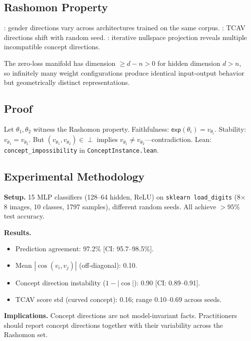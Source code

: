 \documentclass{article}
\newcommand{\incomp}{\perp}
\begin{document}
\subsection{Rashomon Property}

\citet{bolukbasi2016man}: gender directions vary across architectures trained on the same corpus.
\citet{kim2018tcav}: TCAV directions shift with random seed.
\citet{ravfogel2020null}: iterative nullspace projection reveals multiple incompatible concept directions.

The zero-loss manifold has dimension $\geq d - n > 0$ for hidden dimension $d > n$, so infinitely many weight configurations produce identical input-output behavior but geometrically distinct representations.

\subsection{Proof}

Let $\theta_1, \theta_2$ witness the Rashomon property.  Faithfulness: $\mathsf{exp}(\theta_i) = v_{\theta_i}$.  Stability: $v_{\theta_1} = v_{\theta_2}$.  But $(v_{\theta_1}, v_{\theta_2}) \in \incomp$ implies $v_{\theta_1} \neq v_{\theta_2}$---contradiction.  Lean: \texttt{concept\_impossibility} in \texttt{ConceptInstance.lean}.

\subsection{Experimental Methodology}

\textbf{Setup.}  15 MLP classifiers (128--64 hidden, ReLU) on \texttt{sklearn load\_digits} (8$\times$8 images, 10 classes, 1797 samples), different random seeds.  All achieve $> 95\%$ test accuracy.

\textbf{Results.}
\begin{itemize}
  \item Prediction agreement: 97.2\% [CI: 95.7--98.5\%].
  \item Mean $|\cos(v_i, v_j)|$ (off-diagonal): 0.10.
  \item Concept direction instability ($1 - |\cos|$): 0.90 [CI: 0.89--0.91].
  \item TCAV score std (curved concept): 0.16; range 0.10--0.69 across seeds.
\end{itemize}

\textbf{Implications.}  Concept directions are not model-invariant facts.  Practitioners should report concept directions together with their variability across the Rashomon set.
\end{document}

